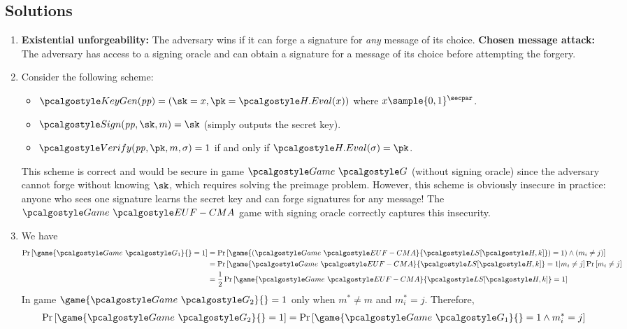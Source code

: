\subsection{Solutions}
\begin{enumerate}
    \item \textbf{Existential unforgeability:} The adversary wins if it can forge a signature for \emph{any} message of its choice.
          \textbf{Chosen message attack:} The adversary has access to a signing oracle and can obtain a signature for a message of its choice before attempting the forgery.
    \item Consider the following scheme:
          \begin{itemize}
              \item $\algo{KeyGen}(\params) = (\sk = x, \pk = \algo{H.Eval}(x))$ where $x \sample \{0,1\}^\secpar$.
              \item $\algo{Sign}(\params, \sk, m) = \sk$ (simply outputs the secret key).
              \item $\algo{Verify}(\params, \pk, m, \sigma) = 1$ if and only if $\algo{H.Eval}(\sigma) = \pk$.
          \end{itemize}
          This scheme is correct and would be secure in game $\Game~\algo{G}$ (without signing oracle) since the adversary cannot forge without knowing $\sk$, which requires solving the preimage problem.
          However, this scheme is obviously insecure in practice: anyone who sees one signature learns the secret key and can forge signatures for any message!
          The $\Game~\algo{EUF-CMA}$ game with signing oracle correctly captures this insecurity.
    \item We have
    \begin{align*}
        \pr{\game{\Game~\algo{G_1}}{} = 1} &= \pr{\game{(\Game~\algo{EUF-CMA}}{\algo{LS[\algo{H}, k]}}) = 1) \wedge (m_i \neq j)} \\
        &= \pr{\game{\Game~\algo{EUF-CMA}}{\algo{LS[\algo{H}, k]}} = 1 | m_i \neq j} \pr{m_i \neq j} \\
        &= \frac{1}{2}\pr{\game{\Game~\algo{EUF-CMA}}{\algo{LS[\algo{H}, k]}} = 1} \\
    \end{align*}
    In game $\game{\Game~\algo{G_2}}{} = 1$ only when $m^* \neq m$ and $m^*_i = j$.
    Therefore,
    \begin{align*}
        \pr{\game{\Game~\algo{G_2}}{} = 1} &= \pr{\game{\Game~\algo{G_1}}{} = 1 \wedge m^*_i = j} \\

\end{align*}
\end{enumerate}
